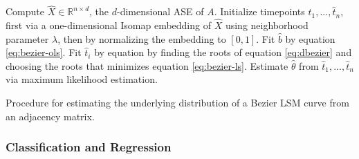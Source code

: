 \documentclass[12pt]{article}
\begin{document}
\begin{algorithm}[H]
\label{alg:bezier-param-fit}
\DontPrintSemicolon
\SetAlgoLined
{}
Compute $\hat{X} \in \mathbb{R}^{n \times d}$, the $d$-dimensional ASE of $A$.\;
Initialize timepoints $\hat{t}_1, ..., \hat{t}_n$, first via a one-dimensional Isomap embedding of $\hat{X}$ using neighborhood parameter $\lambda$, then by normalizing the embedding to $[0, 1]$.\;
 {
  Fit $\hat{b}$ by equation \ref{eq:bezier-ols}.\;
   {
    Fit $\hat{t}_i$ by equation by finding the roots of equation \ref{eq:dbezier} and choosing the roots that minimizes equation \ref{eq:bezier-ls}.\;
  }
}
Estimate $\hat{\theta}$ from $\hat{t}_1, ..., \hat{t}_n$ via maximum likelihood estimation.\; 
\caption{Procedure for estimating the underlying distribution of a Bezier LSM curve from an adjacency matrix.}
\end{algorithm}

\begin{theorem}
\end{theorem}

\hypertarget{classification-and-regression}{%
\subsubsection{Classification and
Regression}\label{classification-and-regression}}
\end{document}

